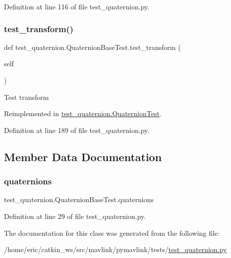 Definition at line 116 of file test\+\_\+quaternion.\+py.

\mbox{\label{classtest__quaternion_1_1QuaternionBaseTest_a161e9e423456902f536eb89e882c8f43}} 
\subsubsection{\texorpdfstring{test\_transform()}{test\_transform()}}
{\footnotesize\ttfamily def test\+\_\+quaternion.\+Quaternion\+Base\+Test.\+test\+\_\+transform (\begin{DoxyParamCaption}\item[{}]{self }\end{DoxyParamCaption})}

\begin{DoxyVerb}Test transform\end{DoxyVerb}
 

Reimplemented in \mbox{\hyperlink{classtest__quaternion_1_1QuaternionTest_a28f8557d25782bfe713fcc3772803f14}{test\+\_\+quaternion.\+Quaternion\+Test}}.



Definition at line 189 of file test\+\_\+quaternion.\+py.



\subsection{Member Data Documentation}
\mbox{\label{classtest__quaternion_1_1QuaternionBaseTest_a9b22d9bab76b02085f9a89f7dec55cc5}} 
\subsubsection{\texorpdfstring{quaternions}{quaternions}}
{\footnotesize\ttfamily test\+\_\+quaternion.\+Quaternion\+Base\+Test.\+quaternions}



Definition at line 29 of file test\+\_\+quaternion.\+py.



The documentation for this class was generated from the following file\+:\begin{DoxyCompactItemize}
\item 
/home/eric/catkin\+\_\+ws/src/mavlink/pymavlink/tests/\mbox{\hyperlink{test__quaternion_8py}{test\+\_\+quaternion.\+py}}\end{DoxyCompactItemize}
